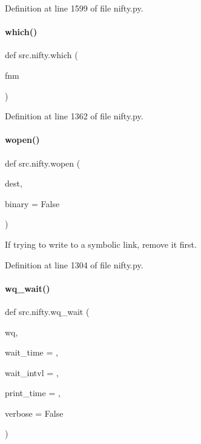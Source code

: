 Definition at line 1599 of file nifty.\+py.

\mbox{\label{namespacesrc_1_1nifty_a5025d057f4ba636315a5b5cb1bd6b00c}} 
\paragraph{\texorpdfstring{which()}{which()}}
{\footnotesize\ttfamily def src.\+nifty.\+which (\begin{DoxyParamCaption}\item[{}]{fnm }\end{DoxyParamCaption})}



Definition at line 1362 of file nifty.\+py.

\mbox{\label{namespacesrc_1_1nifty_a82f89e3045bdeed09a928bb9ce8b0dc1}} 
\paragraph{\texorpdfstring{wopen()}{wopen()}}
{\footnotesize\ttfamily def src.\+nifty.\+wopen (\begin{DoxyParamCaption}\item[{}]{dest,  }\item[{}]{binary = {\ttfamily False} }\end{DoxyParamCaption})}



If trying to write to a symbolic link, remove it first. 



Definition at line 1304 of file nifty.\+py.

\mbox{\label{namespacesrc_1_1nifty_a1f6829e41379fd0b24c3cc2f4d6a8036}} 
\paragraph{\texorpdfstring{wq\+\_\+wait()}{wq\_wait()}}
{\footnotesize\ttfamily def src.\+nifty.\+wq\+\_\+wait (\begin{DoxyParamCaption}\item[{}]{wq,  }\item[{}]{wait\+\_\+time = {},  }\item[{}]{wait\+\_\+intvl = {},  }\item[{}]{print\+\_\+time = {},  }\item[{}]{verbose = {\ttfamily False} }\end{DoxyParamCaption})}



